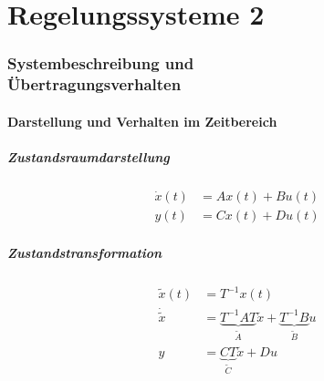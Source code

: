 \documentclass[a4paper,twocolumn,10pt]{article}
\begin{document}
\tableofcontents
\cleardoublepage

\part{Regelungssysteme 2}

\section{Systembeschreibung und\\Übertragungsverhalten}
\subsection{Darstellung und Verhalten im Zeitbereich}
\subsubsection{Zustandsraumdarstellung}
\begin{equation*}
\begin{split}
\dot{x}(t)&=Ax(t)+Bu(t)\\
y(t)&=Cx(t)+Du(t)
\end{split}
\end{equation*}

\subsubsection{Zustandstransformation}
\begin{equation*}
\begin{split}
\tilde{x}(t)&=T^{-1}x(t)\\
\dot{\tilde{x}}&=\underbrace{T^{-1}AT}_{\tilde{A}}\tilde{x}+\underbrace{T^{-1}B}_{\tilde{B}}u\\
y&=\underbrace{CT}_{\tilde{C}}\tilde{x}+Du
\end{split}
\end{equation*}
\end{document}
